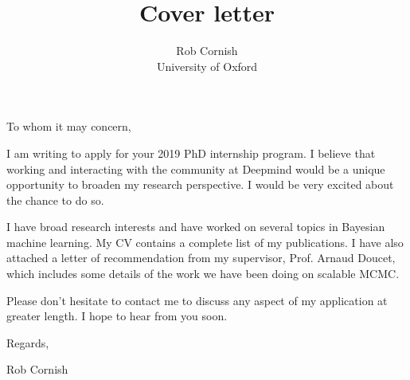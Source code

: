 \documentclass[12pt,a4paper]{article}
\title{Cover letter}
\author{Rob Cornish \\ University of Oxford}
\date{}
\begin{document}
\maketitle

\noindent
To whom it may concern,

\noindent
I am writing to apply for your 2019 PhD internship program. I believe that working and
interacting with the community at Deepmind would be a unique opportunity to broaden my
research perspective. I would be very excited about the chance to do so.

\noindent
I have broad research interests and have worked on several topics in Bayesian machine
learning. My CV contains a complete list of my publications. I have also attached a letter
of recommendation from my supervisor, Prof. Arnaud Doucet, which includes some details of
the work we have been doing on scalable MCMC.

\noindent
Please don't hesitate to contact me to discuss any aspect of my application at greater
length. I hope to hear from you soon.

\noindent
Regards,

\noindent
Rob Cornish
\end{document}
